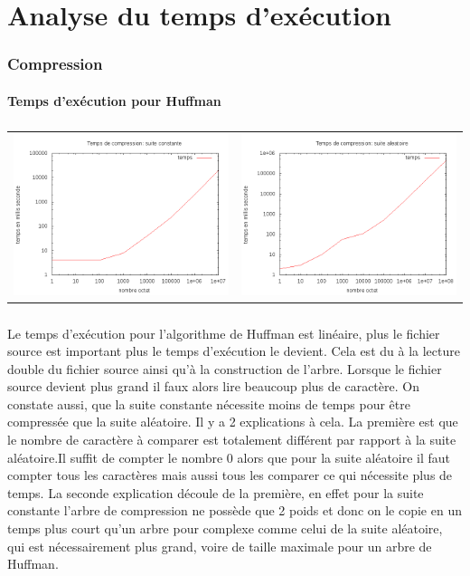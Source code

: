 \documentclass{report}
\begin{document}
\section*{Analyse du temps d’exécution}

\subsubsection*{Compression}
\paragraph*{}
\textbf{Temps d’exécution pour Huffman}
\subparagraph*{}
\hspace{-2cm}\begin{tabular}{l | l}
\includegraphics[width=7cm]{tempsChC.png} & 
\includegraphics[width=7cm]{tempsChA.png}
\end{tabular}

\subparagraph*{}
Le temps d'exécution pour l’algorithme de Huffman est linéaire, plus le fichier source est important plus le temps d'exécution le devient. Cela est du à la lecture double du fichier source ainsi qu'à la construction de l'arbre. Lorsque le fichier source devient plus grand il faux alors lire beaucoup plus de caractère.    
On constate aussi, que la suite constante nécessite moins de temps pour être compressée que la suite aléatoire. Il y a 2 explications à cela. La première est que le nombre de caractère à comparer est totalement différent par rapport à la suite aléatoire.Il suffit de compter le nombre 0 alors que pour la suite aléatoire il faut compter tous les caractères mais aussi tous les comparer ce qui nécessite plus de temps. La seconde explication découle de la première, en effet pour la suite constante l'arbre de compression ne possède que 2 poids et donc on le copie en un temps plus court qu'un arbre pour complexe comme celui de la suite aléatoire, qui est nécessairement plus grand, voire de taille maximale pour un arbre de Huffman.  
\end{document}
